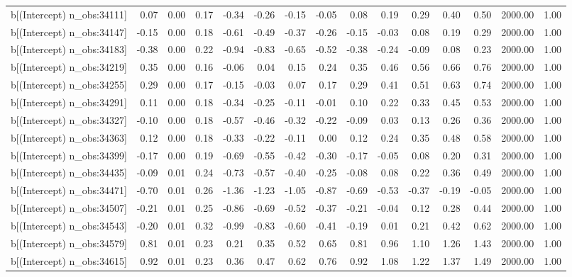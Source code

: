 \begin{table}[ht]
\begin{tabular}{rrrrrrrrrrrrrrr}
  b[(Intercept) n\_obs:34111] & 0.07 & 0.00 & 0.17 & -0.34 & -0.26 & -0.15 & -0.05 & 0.08 & 0.19 & 0.29 & 0.40 & 0.50 & 2000.00 & 1.00 \\ 
  b[(Intercept) n\_obs:34147] & -0.15 & 0.00 & 0.18 & -0.61 & -0.49 & -0.37 & -0.26 & -0.15 & -0.03 & 0.08 & 0.19 & 0.29 & 2000.00 & 1.00 \\ 
  b[(Intercept) n\_obs:34183] & -0.38 & 0.00 & 0.22 & -0.94 & -0.83 & -0.65 & -0.52 & -0.38 & -0.24 & -0.09 & 0.08 & 0.23 & 2000.00 & 1.00 \\ 
  b[(Intercept) n\_obs:34219] & 0.35 & 0.00 & 0.16 & -0.06 & 0.04 & 0.15 & 0.24 & 0.35 & 0.46 & 0.56 & 0.66 & 0.76 & 2000.00 & 1.00 \\ 
  b[(Intercept) n\_obs:34255] & 0.29 & 0.00 & 0.17 & -0.15 & -0.03 & 0.07 & 0.17 & 0.29 & 0.41 & 0.51 & 0.63 & 0.74 & 2000.00 & 1.00 \\ 
  b[(Intercept) n\_obs:34291] & 0.11 & 0.00 & 0.18 & -0.34 & -0.25 & -0.11 & -0.01 & 0.10 & 0.22 & 0.33 & 0.45 & 0.53 & 2000.00 & 1.00 \\ 
  b[(Intercept) n\_obs:34327] & -0.10 & 0.00 & 0.18 & -0.57 & -0.46 & -0.32 & -0.22 & -0.09 & 0.03 & 0.13 & 0.26 & 0.36 & 2000.00 & 1.00 \\ 
  b[(Intercept) n\_obs:34363] & 0.12 & 0.00 & 0.18 & -0.33 & -0.22 & -0.11 & 0.00 & 0.12 & 0.24 & 0.35 & 0.48 & 0.58 & 2000.00 & 1.00 \\ 
  b[(Intercept) n\_obs:34399] & -0.17 & 0.00 & 0.19 & -0.69 & -0.55 & -0.42 & -0.30 & -0.17 & -0.05 & 0.08 & 0.20 & 0.31 & 2000.00 & 1.00 \\ 
  b[(Intercept) n\_obs:34435] & -0.09 & 0.01 & 0.24 & -0.73 & -0.57 & -0.40 & -0.25 & -0.08 & 0.08 & 0.22 & 0.36 & 0.49 & 2000.00 & 1.00 \\ 
  b[(Intercept) n\_obs:34471] & -0.70 & 0.01 & 0.26 & -1.36 & -1.23 & -1.05 & -0.87 & -0.69 & -0.53 & -0.37 & -0.19 & -0.05 & 2000.00 & 1.00 \\ 
  b[(Intercept) n\_obs:34507] & -0.21 & 0.01 & 0.25 & -0.86 & -0.69 & -0.52 & -0.37 & -0.21 & -0.04 & 0.12 & 0.28 & 0.44 & 2000.00 & 1.00 \\ 
  b[(Intercept) n\_obs:34543] & -0.20 & 0.01 & 0.32 & -0.99 & -0.83 & -0.60 & -0.41 & -0.19 & 0.01 & 0.21 & 0.42 & 0.62 & 2000.00 & 1.00 \\ 
  b[(Intercept) n\_obs:34579] & 0.81 & 0.01 & 0.23 & 0.21 & 0.35 & 0.52 & 0.65 & 0.81 & 0.96 & 1.10 & 1.26 & 1.43 & 2000.00 & 1.00 \\ 
  b[(Intercept) n\_obs:34615] & 0.92 & 0.01 & 0.23 & 0.36 & 0.47 & 0.62 & 0.76 & 0.92 & 1.08 & 1.22 & 1.37 & 1.49 & 2000.00 & 1.00 \\ 

\end{tabular}
\end{table}
